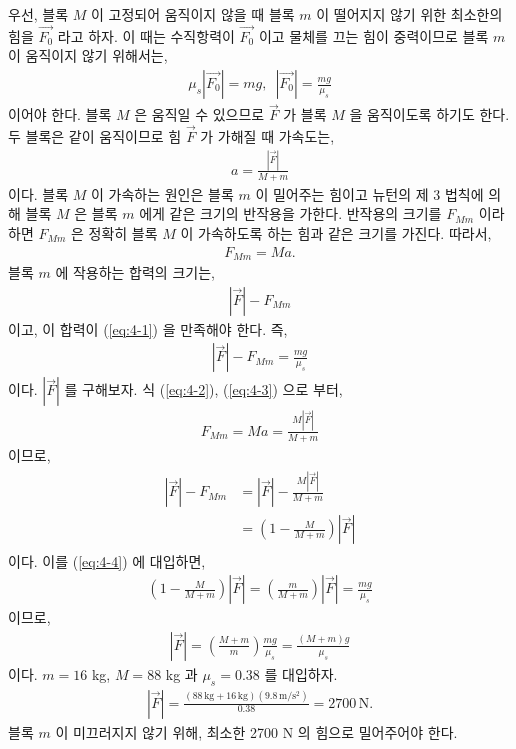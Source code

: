 \documentclass[floatfix,nofootinbib,superscriptaddress,fleqn,preprint]{revtex4}
\begin{document}
 우선, 블록 $M$ 이 고정되어 움직이지 않을 때 
블록 $m$ 이 떨어지지 않기 위한 최소한의 힘을 $\vec{F_0}$ 라고 하자.
이 때는 수직항력이 $\vec{F_0}$ 이고 물체를 끄는 힘이 중력이므로 블록 $m$ 이
움직이지 않기 위해서는,
\begin{align}\label{eq:4-1}
  \mu_s|\vec{F_0}| = mg,\,\,\, |\vec{F_0}| = \frac{mg}{\mu_s}
\end{align}
이어야 한다. 블록 $M$ 은 움직일 수 있으므로 $\vec{F}$ 가 블록 $M$ 을 움직이도록
하기도 한다. 두 블록은 같이 움직이므로 힘 $\vec{F}$ 가 가해질 때 가속도는,
\begin{align}\label{eq:4-2}
  a = \frac{|\vec{F}|}{M+m}
\end{align}
이다. 블록 $M$ 이 가속하는 원인은 블록 $m$ 이 밀어주는 힘이고 뉴턴의 제 3 법칙에 
의해 블록 $M$ 은 블록 $m$ 에게 같은 크기의 반작용을 가한다. 반작용의 크기를 
$F_{Mm}$ 이라 하면 $F_{Mm}$ 은 정확히 블록 $M$ 이 가속하도록 하는 힘과 같은 크기를
가진다. 따라서,
\begin{align}\label{eq:4-3}
  F_{Mm} = Ma.
\end{align}
블록 $m$ 에 작용하는 합력의 크기는,
\begin{align}
  |\vec{F}|-F_{Mm}
\end{align}
이고, 이 합력이 (\ref{eq:4-1}) 을 만족해야 한다. 즉,
\begin{align}\label{eq:4-4}
  |\vec{F}|-F_{Mm} = \frac{mg}{\mu_s}
\end{align}
이다. $|\vec{F}|$ 를 구해보자. 식 (\ref{eq:4-2}), (\ref{eq:4-3}) 으로 부터,
\begin{align}
  F_{Mm} = Ma = \frac{M|\vec{F}|}{M+m}
\end{align}
이므로,
\begin{align}
  \begin{split}
    |\vec{F}|-F_{Mm} 
    &=|\vec{F}|-\frac{M|\vec{F}|}{M+m}  \\
    &=\left(1-\frac{M}{M+m}\right)|\vec{F}|
  \end{split}
\end{align}
이다. 이를 (\ref{eq:4-4}) 에 대입하면,
\begin{align}
  \left(1-\frac{M}{M+m}\right)|\vec{F}|
  =\left(\frac{m}{M+m}\right)|\vec{F}|
  = \frac{mg}{\mu_s}
\end{align}
이므로,
\begin{align}
  |\vec{F}| = \left(\frac{M+m}{m}\right)\frac{mg}{\mu_s}
  = \frac{(M+m)g}{\mu_s}
\end{align}
이다. $m=16$ kg, $M=88$ kg 과 $\mu_s=0.38$ 를 대입하자.
\begin{align}
  |\vec{F}| = \frac{(88\,\mathrm{kg}+16\,\mathrm{kg})
  (9.8\,\mathrm{m/s^2})}{0.38}
   = 2700\,\mathrm{N}.
\end{align}
블록 $m$ 이 미끄러지지 않기 위해, 최소한 2700 N 의 힘으로 밀어주어야 한다.
\end{document}
